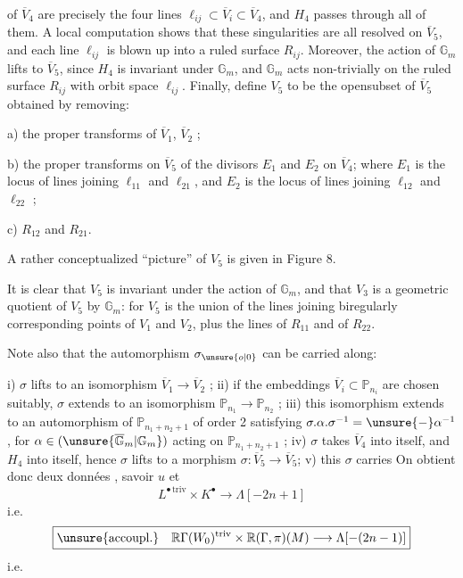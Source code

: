 of $\overline V_4$ are precisely the four lines $\ell_{ij}\subset\overline V_i\subset\overline V_4$, and $H_4$ passes through all of them. A local computation shows that these singularities are all resolved on $\overline V_5$, and each line $\ell_{ij}$ is blown up into a ruled surface $R_{ij}$. Moreover, the action of $\mathbb G_m$ lifts to $\overline V_5$, since $H_4$ is invariant under $\mathbb G_m$, and $\mathbb G_m$ acts non-trivially on the ruled surface $R_{ij}$ with orbit space $\ell_{ij}$. Finally, define $V_5$ to be the opensubset of $\overline V_5$ obtained by removing:
\margin{$\unsure{\sim\sim}$}

a) the proper transforms of $\overline V_1$, $\overline V_2$ ;

b) the proper transforms on $\overline V_5$ of the divisors $E_1$ and $E_2$ on $\overline V_4$; where $E_1$ is the locus of lines joining $\ell_{11}$ and $\ell_{21}$, and $E_2$ is the locus of lines joining $\ell_{12}$ and $\ell_{22}$ ;

c) $R_{12}$ and $R_{21}$.

A rather conceptualized ``picture'' of $V_5$ is given in Figure 8.

It is clear that $V_5$ is invariant under the action of $\mathbb G_m$, and that $V_3$ is a geometric quotient of $V_5$ by $\mathbb G_m$: for $V_5$ is the union of the lines joining biregularly corresponding points of $V_1$ and $V_2$, plus the lines of $R_{11}$ and of $R_{22}$.

Note also that the automorphism $\sigma_{\unsure{o|0}}$ can be carried along:

i) $\sigma$ lifts to an isomorphism $\overline V_1\longrightarrow\overline V_2$ ; ii) if the embeddings $\overline V_i\subset\mathbb P_{n_i}$ are chosen suitably, $\sigma$ extends to an isomorphism $\mathbb P_{n_1}\longrightarrow\mathbb P_{n_2}$ ; iii) this isomorphism extends to an automorphism of $\mathbb P_{n_1+n_2+1}$ of order 2 satisfying $\sigma.\alpha.\sigma^{-1}=\unsure{-}\alpha^{-1}$, for $\alpha\in(\unsure{\overline{\mathbb G}_m|\mathbb G_m})$ acting on $\mathbb P_{n_1+n_2+1}$ ; iv) $\sigma$ takes $\overline V_4$ into itself, and $H_4$ into itself, hence $\sigma$ lifts to a morphism $\sigma:\overline V_5\longrightarrow\overline V_5$; v) this $\sigma$ carries
On obtient donc deux données , savoir $u$ et
\[ L^{\bullet\,\mathrm{triv}}\times K^\bullet\longrightarrow\Lambda[-2n+1] \]
i.e.
\[\boxed{\text{\unsure{accoupl.}}\quad \mathbb R\Gamma(W_0)^{\mathrm{triv}}\times\mathbb R(\Gamma,\pi)(M)\longrightarrow\Lambda[-(2n-1)]}\]
i.e.


